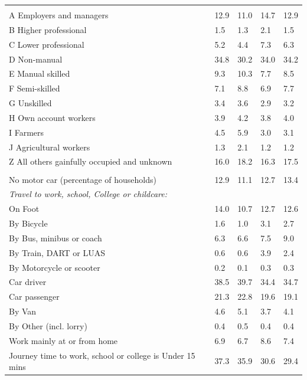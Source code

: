 \documentclass{article}
\begin{document}
\begin{table}[h]
\begin{tabular}{KTTTT}
\hline
    \\ 
    \hline
A Employers and managers & 12.9& 11.0& 14.7& 12.9\\
B Higher professional & 1.5& 1.3& 2.1& 1.5\\
C Lower professional & 5.2& 4.4& 7.3& 6.3\\
D Non-manual & 34.8& 30.2& 34.0& 34.2\\
E Manual skilled &  9.3& 10.3&  7.7&  8.5\\
F Semi-skilled & 7.1& 8.8& 6.9& 7.7\\
G Unskilled & 3.4& 3.6& 2.9& 3.2\\
H Own account workers & 3.9& 4.2& 3.8& 4.0\\
I Farmers & 4.5& 5.9& 3.0& 3.1\\
J Agricultural workers & 1.3& 2.1& 1.2& 1.2\\
Z All others gainfully occupied and unknown & 16.0& 18.2& 16.3& 17.5\\
\hline
{}\hline
    \\ 
    \hline
No motor car (percentage of households) & 12.9& 11.1& 12.7& 
13.4\\
    \hline 
\emph{Travel to work, school, College or childcare:} & & & \\
\quad On Foot & 14.0& 10.7& 12.7& 12.6\\ 
\quad By Bicycle & 1.6& 1.0& 3.1& 2.7\\ 
\quad By Bus, minibus or coach & 6.3& 6.6& 7.5& 9.0\\
\quad By Train, DART or LUAS & 0.6& 0.6& 3.9& 2.4\\
\quad By Motorcycle or scooter & 0.2& 0.1& 0.3& 0.3\\
\quad Car driver & 38.5 & 39.7& 34.4& 34.7\\
\quad Car passenger & 21.3& 22.8& 19.6& 19.1\\
\quad By Van & 4.6& 5.1& 3.7& 4.1\\
\quad By Other (incl. lorry) & 0.4& 0.5& 0.4& 0.4\\
    \hline
Work mainly at or from home & 6.9& 6.7& 8.6& 7.4\\
Journey time to work, school or college is Under 15 mins & 37.3& 35.9& 30.6& 29.4\\

\end{tabular}
\end{table}
\end{document}
